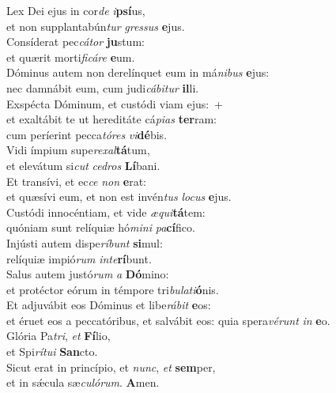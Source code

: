 \oddverse Lex Dei ejus in cor\textit{de} \textit{i}\textbf{psí}us,~\*\\
\oddverse et non supplantabún\textit{tur} \textit{gres}\textit{sus} \textbf{e}jus.\\
\evenverse Consíderat pec\textit{cá}\textit{tor} \textbf{ju}stum:~\*\\
\evenverse et quærit morti\textit{fi}\textit{cá}\textit{re} \textbf{e}um.\\
\oddverse Dóminus autem non derelínquet eum in má\textit{ni}\textit{bus} \textbf{e}jus:~\*\\
\oddverse nec damnábit eum, cum judi\textit{cá}\textit{bi}\textit{tur} \textbf{il}li.\\
\evenverse Exspécta Dóminum, et custódi viam ejus:~+\\
\evenverse  et exaltábit te ut hereditáte cá\textit{pi}\textit{as} \textbf{ter}ram:~\*\\
\evenverse cum períerint pecca\textit{tó}\textit{res} \textit{vi}\textbf{dé}bis.\\
\oddverse Vidi ímpium supe\textit{re}\textit{xal}\textbf{tá}tum,~\*\\
\oddverse et elevátum si\textit{cut} \textit{ce}\textit{dros} \textbf{Lí}bani.\\
\evenverse Et transívi, et ec\textit{ce} \textit{non} \textbf{e}rat:~\*\\
\evenverse et quæsívi eum, et non est invén\textit{tus} \textit{lo}\textit{cus} \textbf{e}jus.\\
\oddverse Custódi innocéntiam, et vide \textit{æ}\textit{qui}\textbf{tá}tem:~\*\\
\oddverse quóniam sunt relíquiæ hó\textit{mi}\textit{ni} \textit{pa}\textbf{cí}fico.\\
\evenverse Injústi autem dispe\textit{rí}\textit{bunt} \textbf{si}mul:~\*\\
\evenverse relíquiæ impió\textit{rum} \textit{in}\textit{te}\textbf{rí}bunt.\\
\oddverse Salus autem justó\textit{rum} \textit{a} \textbf{Dó}mino:~\*\\
\oddverse et protéctor eórum in témpore tri\textit{bu}\textit{la}\textit{ti}\textbf{ó}nis.\\
\evenverse Et adjuvábit eos Dóminus et libe\textit{rá}\textit{bit} \textbf{e}os:~\*\\
\evenverse et éruet eos a peccatóribus, et salvábit eos: quia spera\textit{vé}\textit{runt} \textit{in} \textbf{e}o.\\
\oddverse Glória Pa\textit{tri}, \textit{et} \textbf{Fí}lio,~\*\\
\oddverse et Spi\textit{rí}\textit{tu}\textit{i} \textbf{San}cto.\\
\evenverse Sicut erat in princípio, et \textit{nunc}, \textit{et} \textbf{sem}per,~\*\\
\evenverse et in sǽcula sæ\textit{cu}\textit{ló}\textit{rum}. \textbf{A}men.\\
